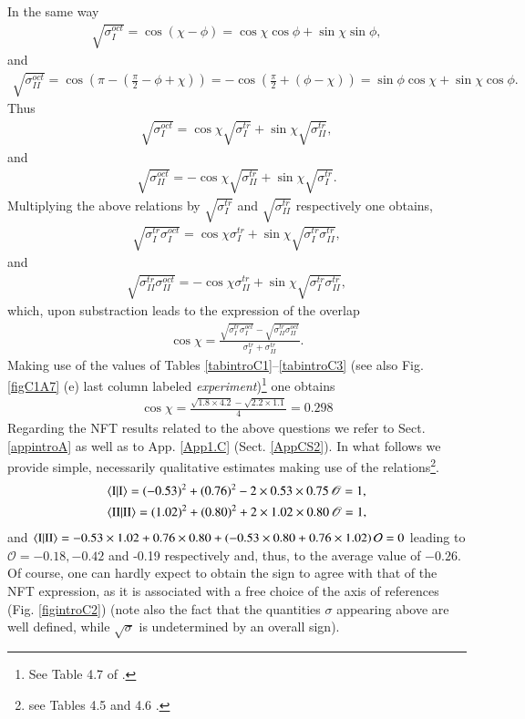 In the same way
\begin{align}
\sqrt{\sigma^{oct}_I}=\cos(\chi-\phi)=\cos\chi\cos\phi+\sin\chi\sin\phi,
\end{align}
and
\begin{align}
\sqrt{\sigma^{oct}_{II}}=\cos\left(\pi-\left(\frac{\pi}{2}-\phi+\chi\right)\right)=-\cos\left(\frac{\pi}{2}+(\phi-\chi)\right)=\sin\phi\cos\chi+\sin\chi\cos\phi.
\end{align}
Thus
\begin{align}
\sqrt{\sigma^{oct}_{I}}=\cos\chi\sqrt{\sigma^{tr}_{I}}+\sin\chi\sqrt{\sigma^{tr}_{II}},
\end{align}
and
\begin{align}
\sqrt{\sigma^{oct}_{II}}=-\cos\chi\sqrt{\sigma^{tr}_{II}}+\sin\chi\sqrt{\sigma^{tr}_{I}}.
\end{align}
Multiplying the above relations by $\sqrt{\sigma^{tr}_{I}}$ and $\sqrt{\sigma^{tr}_{II}}$ respectively one obtains,
\begin{align}
\sqrt{\sigma^{tr}_{I}\sigma^{oct}_{I}}=\cos\chi\sigma^{tr}_I+\sin\chi\sqrt{\sigma^{tr}_{I}\sigma^{tr}_{II}},
\end{align}
and
\begin{align}
\sqrt{\sigma^{tr}_{II}\sigma^{oct}_{II}}=-\cos\chi\sigma^{tr}_{II}+\sin\chi\sqrt{\sigma^{tr}_{I}\sigma^{tr}_{II}},
\end{align}
which, upon substraction  leads to the  expression of the overlap
\begin{align}
\cos\chi=\frac{\sqrt{\sigma^{tr}_{I}\sigma^{oct}_{I}}-\sqrt{\sigma^{tr}_{II}\sigma^{oct}_{II}}}{\sigma_I^{tr}+\sigma_{II}^{tr}}.
\end{align}
Making use of the values of Tables \ref{tabintroC1}--\ref{tabintroC3} (see also Fig. \ref{figC1A7} (e) last column labeled \textit{experiment})\footnote{See Table 4.7 of \cite{Bortignon:77}.} one obtains
\begin{align}
\cos\chi=\frac{\sqrt{1.8\times4.2}-\sqrt{2.2\times1.1}}{4}=0.298
\end{align}
  Regarding the NFT results related to  the above questions we refer to Sect. \ref{appintroA} as well as to App. \ref{App1.C} (Sect. \ref{AppCS2}). In what follows we provide  simple, necessarily qualitative estimates  making use of the relations\footnote{see Tables 4.5 and 4.6  \cite{Bortignon:77}.}.
\begin{align}
\nonumber &\langle {\text{I}|\text{I}} \rangle= (-0.53)^2+(0.76)^2-2\times0.53\times0.75\, \mathscr O=1,\\
\nonumber &\langle {\text{II}|\text{II}} \rangle= (1.02)^2+(0.80)^2+2\times1.02\times0.80\, \mathscr O=1,
\end{align}
and $\langle {\text{I}|\text{II}} \rangle=-0.53\times1.02+0.76\times0.80+(-0.53\times0.80+0.76\times1.02)\,\mathcal O=0$ leading to $\mathcal O=-0.18, -0.42$ and -0.19 respectively and, thus, to the average value of \mbox{$-0.26$}.
 Of course, one can hardly expect to obtain the sign to agree with that of the NFT expression, as it is associated with a free choice of the axis of references (Fig. \ref{figintroC2}) (note also the fact that the quantities $\sigma$ appearing above are well defined, while $\sqrt{\sigma}$ is undetermined by an overall sign).
